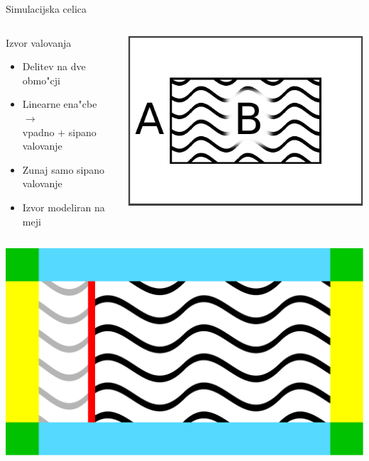 \documentclass{beamer}
\begin{document}
\begin{frame}{Simulacijska celica}
\begin{columns}
 
 
 \begin{block}{Izvor valovanja}
 \begin{itemize}
  \item Delitev na dve obmo"cji
  \item Linearne ena"cbe $\rightarrow$ \\ vpadno + sipano valovanje
  \item Zunaj samo sipano valovanje
  \item Izvor modeliran na meji
 \end{itemize}
 \end{block}

 \begin{center}
 \includegraphics[width=.8\textwidth]{./Slike/wave-source-regions-one}
 \end{center}
 \end{columns}
 \begin{columns}


 \begin{center}
 \includegraphics[width=.9\textwidth]{./Slike/celica}
 \end{center}


\end{columns}
\end{frame}
\end{document}
